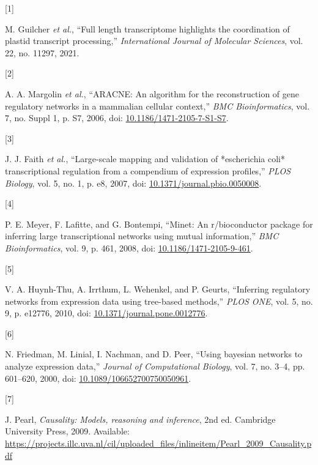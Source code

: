 \documentclass[
]{article}
\newlength{\cslhangindent}
\newlength{\csllabelwidth}
\newenvironment{CSLReferences}[2] %
 {\begin{list}{}{%
  \setlength{\itemindent}{0pt}
  \setlength{\leftmargin}{0pt}
  \setlength{\parsep}{0pt}
  \ifodd #1
   \setlength{\leftmargin}{\cslhangindent}
   \setlength{\itemindent}{-1\cslhangindent}
  \fi
  \setlength{\itemsep}{#2\baselineskip}}}
 {\end{list}}
\newcommand{\CSLLeftMargin}[1]{\parbox[t]{\csllabelwidth}{\strut#1\strut}}
\newcommand{\CSLRightInline}[1]{\parbox[t]{\linewidth - \csllabelwidth}{\strut#1\strut}}
\theoremstyle{definition}
\theoremstyle{remark}
\begin{document}
\label{refs}
\begin{CSLReferences}{0}{0}
\CSLLeftMargin{{[}1{]} }%
\CSLRightInline{M. Guilcher \emph{et al.}, {``Full length transcriptome
highlights the coordination of plastid transcript processing,''}
\emph{International Journal of Molecular Sciences}, vol. 22, no. 11297,
2021.}

\CSLLeftMargin{{[}2{]} }%
\CSLRightInline{A. A. Margolin \emph{et al.}, {``ARACNE: An algorithm
for the reconstruction of gene regulatory networks in a mammalian
cellular context,''} \emph{BMC Bioinformatics}, vol. 7, no. Suppl 1, p.
S7, 2006, doi:
\href{https://doi.org/10.1186/1471-2105-7-S1-S7}{10.1186/1471-2105-7-S1-S7}.}

\CSLLeftMargin{{[}3{]} }%
\CSLRightInline{J. J. Faith \emph{et al.}, {``Large-scale mapping and
validation of *escherichia coli* transcriptional regulation from a
compendium of expression profiles,''} \emph{PLOS Biology}, vol. 5, no.
1, p. e8, 2007, doi:
\href{https://doi.org/10.1371/journal.pbio.0050008}{10.1371/journal.pbio.0050008}.}

\CSLLeftMargin{{[}4{]} }%
\CSLRightInline{P. E. Meyer, F. Lafitte, and G. Bontempi, {``Minet: An
r/bioconductor package for inferring large transcriptional networks
using mutual information,''} \emph{BMC Bioinformatics}, vol. 9, p. 461,
2008, doi:
\href{https://doi.org/10.1186/1471-2105-9-461}{10.1186/1471-2105-9-461}.}

\CSLLeftMargin{{[}5{]} }%
\CSLRightInline{V. A. Huynh-Thu, A. Irrthum, L. Wehenkel, and P. Geurts,
{``Inferring regulatory networks from expression data using tree-based
methods,''} \emph{PLOS ONE}, vol. 5, no. 9, p. e12776, 2010, doi:
\href{https://doi.org/10.1371/journal.pone.0012776}{10.1371/journal.pone.0012776}.}

\CSLLeftMargin{{[}6{]} }%
\CSLRightInline{N. Friedman, M. Linial, I. Nachman, and D. Peer,
{``Using bayesian networks to analyze expression data,''} \emph{Journal
of Computational Biology}, vol. 7, no. 3--4, pp. 601--620, 2000, doi:
\href{https://doi.org/10.1089/106652700750050961}{10.1089/106652700750050961}.}

\CSLLeftMargin{{[}7{]} }%
\CSLRightInline{J. Pearl, \emph{Causality: Models, reasoning and
inference}, 2nd ed. Cambridge University Press, 2009. Available:
\url{https://projects.illc.uva.nl/cil/uploaded_files/inlineitem/Pearl_2009_Causality.pdf}}


\end{CSLReferences}
\end{document}
